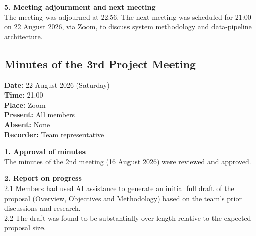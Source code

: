 \textbf{5. Meeting adjournment and next meeting} \\
The meeting was adjourned at 22:56. The next meeting was scheduled for 21:00 on 22 August 2026, via Zoom, to discuss system methodology and data-pipeline architecture.

\clearpage
\subsection{Minutes of the 3rd Project Meeting}

\textbf{Date:} 22 August 2026 (Saturday) \\
\textbf{Time:} 21:00 \\
\textbf{Place:} Zoom \\
\textbf{Present:} All members \\
\textbf{Absent:} None \\
\textbf{Recorder:} Team representative

\textbf{1. Approval of minutes} \\
The minutes of the 2nd meeting (16 August 2026) were reviewed and approved.

\textbf{2. Report on progress} \\
2.1 Members had used AI assistance to generate an initial full draft of the proposal (Overview, Objectives and Methodology) based on the team's prior discussions and research. \\
2.2 The draft was found to be substantially over length relative to the expected proposal size.

